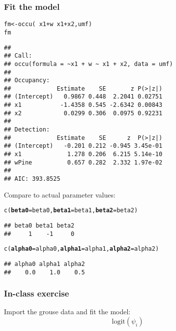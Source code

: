\documentclass[color=usenames,dvipsnames]{beamer}\usepackage[]{graphicx}\usepackage[]{color}
\makeatletter
\newcommand{\hlopt}[1]{\textcolor[rgb]{0,0,0}{#1}}%
\newcommand{\hlstd}[1]{\textcolor[rgb]{0,0,0}{#1}}%
\newcommand{\hlkwb}[1]{\textcolor[rgb]{0,0.341,0.682}{#1}}%
\newcommand{\hlkwc}[1]{\textcolor[rgb]{0,0,0}{\textbf{#1}}}%
\newcommand{\hlkwd}[1]{\textcolor[rgb]{0.004,0.004,0.506}{#1}}%
\newenvironment{kframe}{%
 \def\at@end@of@kframe{}%
 \ifinner\ifhmode%
  \def\at@end@of@kframe{\end{minipage}}%
  \begin{minipage}{\columnwidth}%
 \fi\fi%
 \def\FrameCommand##1{\hskip\@totalleftmargin \hskip-\fboxsep
 \colorbox{shadecolor}{##1}\hskip-\fboxsep
     \hskip-\linewidth \hskip-\@totalleftmargin \hskip\columnwidth}%
 \MakeFramed {\advance\hsize-\width
   \@totalleftmargin\z@ \linewidth\hsize
   \@setminipage}}%
 {\par\unskip\endMakeFramed%
 \at@end@of@kframe}
\newenvironment{knitrout}{}{} %
\makeatother
\begin{document}
\begin{frame}[fragile]
  \frametitle{Fit the model}
  \footnotesize
\begin{knitrout}\tiny
{}\color{fgcolor}\begin{kframe}
\begin{alltt}
\hlstd{fm} \hlkwb{<-} \hlkwd{occu}\hlstd{(}\hlopt{~}\hlstd{x1}\hlopt{+}\hlstd{w} \hlopt{~}\hlstd{x1}\hlopt{+}\hlstd{x2, umf)}
\hlstd{fm}
\end{alltt}
\begin{verbatim}
## 
## Call:
## occu(formula = ~x1 + w ~ x1 + x2, data = umf)
## 
## Occupancy:
##             Estimate    SE       z P(>|z|)
## (Intercept)   0.9867 0.448  2.2041 0.02751
## x1           -1.4358 0.545 -2.6342 0.00843
## x2            0.0299 0.306  0.0975 0.92231
## 
## Detection:
##             Estimate    SE      z  P(>|z|)
## (Intercept)   -0.201 0.212 -0.945 3.45e-01
## x1             1.278 0.206  6.215 5.14e-10
## wPine          0.657 0.282  2.332 1.97e-02
## 
## AIC: 393.8525
\end{verbatim}
\end{kframe}
\end{knitrout}
\pause
\vfill
Compare to actual parameter values:
\begin{knitrout}\tiny
{}\color{fgcolor}\begin{kframe}
\begin{alltt}
\hlkwd{c}\hlstd{(}\hlkwc{beta0}\hlstd{=beta0,} \hlkwc{beta1}\hlstd{=beta1,} \hlkwc{beta2}\hlstd{=beta2)}
\end{alltt}
\begin{verbatim}
## beta0 beta1 beta2 
##     1    -1     0
\end{verbatim}
\begin{alltt}
\hlkwd{c}\hlstd{(}\hlkwc{alpha0}\hlstd{=alpha0,} \hlkwc{alpha1}\hlstd{=alpha1,} \hlkwc{alpha2}\hlstd{=alpha2)}
\end{alltt}
\begin{verbatim}
## alpha0 alpha1 alpha2 
##    0.0    1.0    0.5
\end{verbatim}
\end{kframe}
\end{knitrout}
\end{frame}




\begin{frame}
  \frametitle{In-class exercise}
  Import the grouse data and fit the model:
  \[
    \mathrm{logit}(\psi_i)
  \]
\end{frame}
\end{document}
